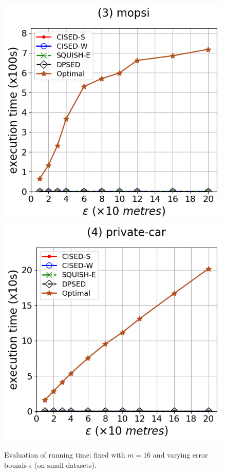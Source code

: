 {\begin{figure}[tb!]
\includegraphics[scale = 0.290]{Figures/Exp-opt-time-epsilon-mopsi.png}\hspace{1ex}
\includegraphics[scale = 0.290]{Figures/Exp-opt-time-epsilon-private.png}
\caption{\small Evaluation of running time: fixed with $m=16$ and varying error bounds $\epsilon$ (on small datasets).}
\label{fig:time-optimal-epsilon}
\end{figure}




}

